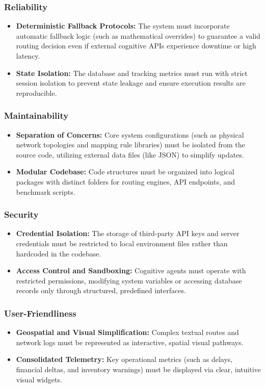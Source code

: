\subsubsection{Reliability}
\begin{itemize}
    \item \textbf{Deterministic Fallback Protocols:} The system must incorporate automatic fallback logic (such as mathematical overrides) to guarantee a valid routing decision even if external cognitive APIs experience downtime or high latency.
    \item \textbf{State Isolation:} The database and tracking metrics must run with strict session isolation to prevent state leakage and ensure execution results are reproducible.
\end{itemize}

\subsubsection{Maintainability}
\begin{itemize}
    \item \textbf{Separation of Concerns:} Core system configurations (such as physical network topologies and mapping rule libraries) must be isolated from the source code, utilizing external data files (like JSON) to simplify updates.
    \item \textbf{Modular Codebase:} Code structures must be organized into logical packages with distinct folders for routing engines, API endpoints, and benchmark scripts.
\end{itemize}

\subsubsection{Security}
\begin{itemize}
    \item \textbf{Credential Isolation:} The storage of third-party API keys and server credentials must be restricted to local environment files rather than hardcoded in the codebase.
    \item \textbf{Access Control and Sandboxing:} Cognitive agents must operate with restricted permissions, modifying system variables or accessing database records only through structured, predefined interfaces.
\end{itemize}

\subsubsection{User-Friendliness}
\begin{itemize}
    \item \textbf{Geospatial and Visual Simplification:} Complex textual routes and network logs must be represented as interactive, spatial visual pathways.
    \item \textbf{Consolidated Telemetry:} Key operational metrics (such as delays, financial deltas, and inventory warnings) must be displayed via clear, intuitive visual widgets.
\end{itemize}

